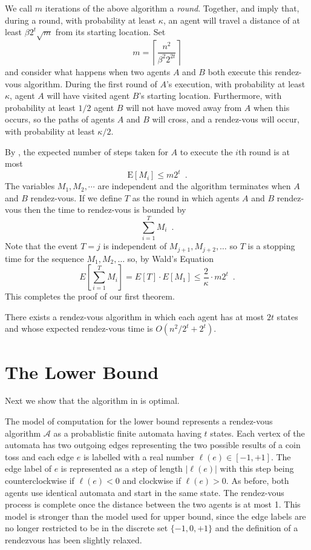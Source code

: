 \documentclass[lotsofwhite]{patmorin}
\newcommand{\E}{\mathrm{E}}
\newcommand{\A}{\mathcal{A}}
\begin{document}
We call $m$ iterations of the above algorithm a \emph{round}.
Together,  and  imply that, during a
round, with probability at least $\kappa$, an agent will travel a
distance of at least $\beta 2^t \sqrt{m}$ from its starting
location.  Set
\[
   m= \left\lceil \frac{n^2}{\beta^2 2^{2t}} \right\rceil 
\]
and consider what happens when two agents $A$ and $B$ both execute
this rendez-vous algorithm.  During the first round of $A$'s
execution, with probability at least $\kappa$, agent $A$ will have
visited agent $B$'s starting location. Furthermore, with probability
at least $1/2$ agent $B$ will not have moved away from $A$ when this
occurs, so the paths of agents $A$ and $B$ will cross, and a
rendez-vous will occur, with probability at least $\kappa/2$.

By , the expected number of steps taken for $A$ to
execute the $i$th round is at most
\[
    \E[M_i] \le m 2^{t} \enspace . 
\]
The variables $M_1,M_2,\cdots$ are independent and the algorithm
terminates when $A$ and $B$ rendez-vous.  If we define $T$ as
the round in which agents $A$ and $B$ rendez-vous then the time to
rendez-vous is bounded by
\[
   \sum_{i=1}^T M_i \enspace .
\]
Note that the event $T=j$ is independent of $M_{j+1},M_{j+2},\ldots$
so $T$ is a stopping time for the sequence
$M_1,M_2,\ldots$ so, by Wald's Equation
\[
   E\left[\sum_{i=1}^T M_i\right] = E[T]\cdot E[M_1] \le
\frac{2}{\kappa}\cdot 
m 2^{t} \enspace .
\]
This completes the proof of our first theorem.
\begin{thm}
There exists a rendez-vous algorithm in which each agent has at most
$2t$ states and whose expected rendez-vous time is
$O(n^2/2^{t} + 2^{t})$.
\end{thm}

\section{The Lower Bound}

Next we show that the algorithm in  is
optimal.

The model of computation for the lower bound represents a rendez-vous
algorithm $\A$ as a probablistic finite automata having $t$ states. Each
vertex of the automata has two outgoing edges representing the two possible
results of a coin toss and each edge $e$ is labelled with a real
number $\ell(e)\in[-1,+1]$.  The edge label of $e$ is represented as a
step of length $|\ell(e)|$ with this step being counterclockwise if
$\ell(e)<0$ and clockwise if $\ell(e)>0$.  As before, both agents use
identical automata and start in the same state.  The rendez-vous process
is complete once the distance between the two agents is at most 1.
This model is stronger than the model used for upper bound,
since the edge labels are no longer restricted to be in the discrete
set $\{-1,0,+1\}$ and the definition of a rendezvous has been slightly
relaxed.
\end{document}
